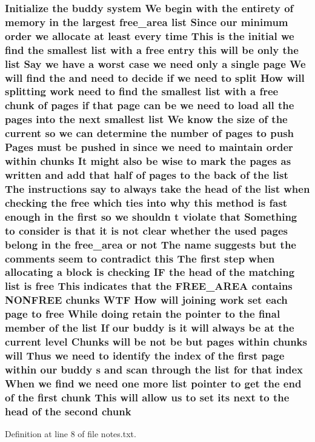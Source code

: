 \subsubsection[{\texorpdfstring{chunk}{chunk}}]{\setlength{\rightskip}{0pt plus 5cm}Initialize the buddy system We begin with the entirety of memory {\bf in} the largest {\bf free\+\_\+area} {\bf list} Since our minimum {\bf order} we allocate at least every time This {\bf is} the initial we find the smallest {\bf list} with a free entry this will be only the {\bf list} Say we have a worst case we need only a single {\bf page} We will find the and need to decide if we need to {\bf split} How will splitting work need to find the smallest {\bf list} with a free chunk of {\bf pages} if that {\bf page} can be we need to load all the {\bf pages} into the next smallest {\bf list} We know the size of the current {\bf so} we can determine the number of {\bf pages} to push Pages must be pushed {\bf in} since we need to maintain {\bf order} within chunks It might also be wise to mark the {\bf pages} as written and add that half of {\bf pages} to the back of the {\bf list} The instructions say to always take the head of the {\bf list} when checking the free which ties into why this method {\bf is} fast enough {\bf in} the {\bf first} {\bf so} we shouldn t violate that Something to consider {\bf is} that {\bf it} {\bf is} {\bf not} clear whether the used {\bf pages} belong {\bf in} the {\bf free\+\_\+area} or {\bf not} The name suggests but the comments seem to contradict this The {\bf first} step when allocating a block {\bf is} checking IF the head of the matching {\bf list} {\bf is} free This indicates that the F\+R\+E\+E\+\_\+\+A\+R\+EA contains N\+O\+N\+F\+R\+EE chunks W\+TF How will joining work set each {\bf page} to free While doing retain the pointer to the final member of the {\bf list} If our buddy {\bf is} {\bf it} will always be at the current level Chunks will be {\bf not} be but {\bf pages} within chunks will Thus we need to identify the index of the {\bf first} {\bf page} within our buddy s and scan through the {\bf list} for that index When we find we need one more {\bf list} pointer to get the end of the {\bf first} chunk This will allow us to set its next to the head of the second chunk}\hypertarget{notes_8txt_a60c3f3ea1420be8254648913cbf8b336}{}\label{notes_8txt_a60c3f3ea1420be8254648913cbf8b336}


Definition at line 8 of file notes.\+txt.

